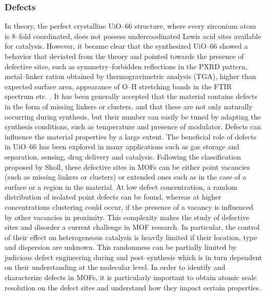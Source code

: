 \subsubsection{Defects}
In theory, the perfect crystalline UiO--66 structure, where every zirconium atom is 8--fold coordinated, does not possess undercoodinated Lewis acid sites available for catalysis. However, it became clear that the synthesized UiO--66 showed a behavior that deviated from the theory and pointed towards the presence of defective sites, such as symmetry--forbidden reflections in the PXRD pattern, metal--linker ration obtained by thermogravimetric analysis (TGA), higher than expected surface area, appearance of O--H stretching bands in the FTIR spectrum etc. \cite{shearer2014tuned, valenzano2011disclosing}. It has been generally accepted that the material contains defects in the form of missing linkers or clusters, and that these are not only naturally occurring during synthesis, but their number can easily be tuned by adapting the synthesis conditions, such as temperature and presence of modulator\cite{wu2013unusual, shearer2016defect}.
\npar
Defects can influence the material properties by a large extent. The beneficial role of defects in UiO--66 has been explored in many applications such as gas storage and separation\cite{wu2013unusual, ren2014modulated}, sensing\cite{stassen2016towards}, drug delivery\cite{cunha2013rationale} and catalysis\cite{vermoortele2013synthesis, rogge2017metal}. 
Following the classification proposed by Sholl, these defective sites in MOFs can be either point vacancies (such as missing linkers or clusters) or extended ones such as in the case of a surface \cite{sholl2015defects} or a region in the material. At low defect concentration, a random distribution of isolated point defects can be found, whereas at higher concentrations clustering could occur, if the presence of a vacancy is influenced by other vacancies in proximity. This complexity makes the study of defective sites and disorder a current challenge in MOF research. In particular, the control of their effect on heterogeneous catalysis is heavily limited if their location, type and dispersion are unknown. This randomness can be partially limited by judicious defect engineering during and post--synthesis which is in turn dependent on their understanding at the molecular level. In order to identify and characterize defects in MOFs, it is particularly important to obtain atomic scale resolution on the defect sites and understand how they impact certain properties.
